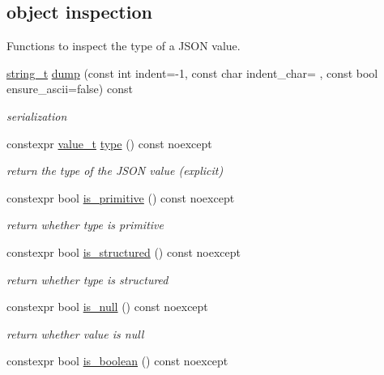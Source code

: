 \subsection*{object inspection}
\label{_amgrpbbb01a37b8f261ae5b5799058dcac1a0}%
Functions to inspect the type of a J\+S\+ON value. \begin{DoxyCompactItemize}
\item 
\hyperlink{classnlohmann_1_1basic__json_a61f8566a1a85a424c7266fb531dca005}{string\+\_\+t} \hyperlink{classnlohmann_1_1basic__json_ae5bfe31e51a06f32c273a3e79a4ea872}{dump} (const int indent=-\/1, const char indent\+\_\+char= \textquotesingle{} \textquotesingle{}, const bool ensure\+\_\+ascii=false) const 
\begin{DoxyCompactList}\small\item\em serialization \end{DoxyCompactList}\item 
constexpr \hyperlink{namespacenlohmann_1_1detail_a90aa5ef615aa8305e9ea20d8a947980f}{value\+\_\+t} \hyperlink{classnlohmann_1_1basic__json_a2b2d781d7f2a4ee41bc0016e931cadf7}{type} () const noexcept
\begin{DoxyCompactList}\small\item\em return the type of the J\+S\+ON value (explicit) \end{DoxyCompactList}\item 
constexpr bool \hyperlink{classnlohmann_1_1basic__json_a6362b88718eb5c6d4fed6a61eed44b95}{is\+\_\+primitive} () const noexcept
\begin{DoxyCompactList}\small\item\em return whether type is primitive \end{DoxyCompactList}\item 
constexpr bool \hyperlink{classnlohmann_1_1basic__json_a9f68a0af820c3ced7f9d17851ce4c22d}{is\+\_\+structured} () const noexcept
\begin{DoxyCompactList}\small\item\em return whether type is structured \end{DoxyCompactList}\item 
constexpr bool \hyperlink{classnlohmann_1_1basic__json_a8faa039ca82427ed29c486ffd00600c3}{is\+\_\+null} () const noexcept
\begin{DoxyCompactList}\small\item\em return whether value is null \end{DoxyCompactList}\item 
constexpr bool \hyperlink{classnlohmann_1_1basic__json_a943e8cb182d0f2365c76d64b42eaa6fd}{is\+\_\+boolean} () const noexcept

\end{DoxyCompactItemize}
